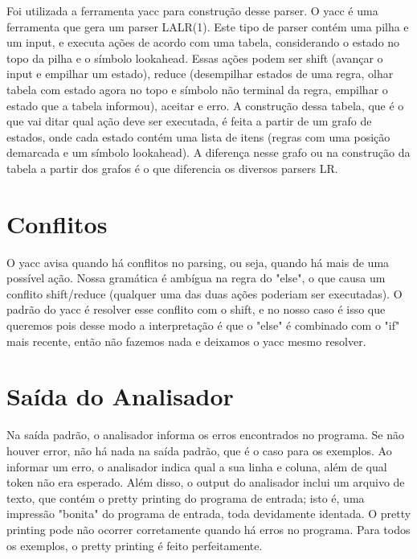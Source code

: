 Foi utilizada a ferramenta yacc para construção desse parser. O yacc é uma ferramenta que gera um parser LALR(1). Este tipo de parser contém uma pilha e um input, e executa ações de acordo com uma tabela, considerando o estado no topo da pilha e o símbolo lookahead. Essas ações podem ser shift (avançar o input e empilhar um estado), reduce (desempilhar estados de uma regra, olhar tabela com estado agora no topo e símbolo não terminal da regra, empilhar o estado que a tabela informou), aceitar e erro. A construção dessa tabela, que é o que vai ditar qual ação deve ser executada, é feita a partir de um grafo de estados, onde cada estado contém uma lista de itens (regras com uma posição demarcada e um símbolo lookahead). A diferença nesse grafo ou na construção da tabela a partir dos grafos é o que diferencia os diversos parsers LR.

\section{Conflitos}
O yacc avisa quando há conflitos no parsing, ou seja, quando há mais de uma possível ação. Nossa gramática é ambígua na regra do "else", o que causa um conflito shift/reduce (qualquer uma das duas ações poderiam ser executadas). O padrão do yacc é resolver esse conflito com o shift, e no nosso caso é isso que queremos pois desse modo a interpretação é que o "else" é combinado com o "if" mais recente, então não fazemos nada e deixamos o yacc mesmo resolver.

\section{Saída do Analisador}
Na saída padrão, o analisador informa os erros encontrados no programa. Se não houver error, não há nada na saída padrão, que é o caso para os exemplos. Ao informar um erro, o analisador indica qual a sua linha e coluna, além de qual token não era esperado.
Além disso, o output do analisador inclui um arquivo de texto, que contém o pretty printing do programa de entrada; isto é, uma impressão "bonita" do programa de entrada, toda devidamente identada. O pretty printing pode não ocorrer corretamente quando há erros no programa. Para todos os exemplos, o pretty printing é feito perfeitamente.

